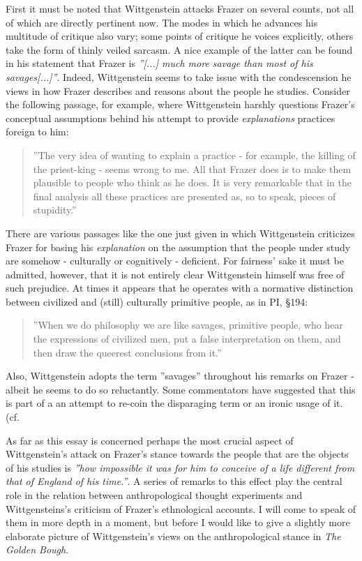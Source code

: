 \documentclass{article}
\begin{document}
First it must be noted that Wittgenstein attacks Frazer on several counts, not all of which are directly pertinent now. The modes in which he advances his multitude of critique also vary; some points of critique he voices explicitly, others take the form of thinly veiled sarcasm. A nice example of the latter can be found in his statement that Frazer is \textit{''[...] much more savage than most of his savages[...]''}.
Indeed, Wittgenstein seems to take issue with the condescension he views in how Frazer describes and reasons about the people he studies. Consider the following passage, for example, where Wittgenstein harshly questions Frazer's conceptual assumptions behind his attempt to provide \textit{explanations} practices foreign to him:
 \begin{quote}
 ''The very idea of wanting to explain a practice - for example, the killing of the priest-king - seems wrong to me. All that Frazer does is to make them plausible to people who think as he does. It is very remarkable that in the final analysis all these practices are presented as, so to speak, pieces of stupidity.''%
 \end{quote}
 There are various passages like the one just given in which Wittgenstein criticizes Frazer for basing his \textit{explanation} on the assumption that the people under study are somehow - culturally or cognitively - deficient. For fairness' sake it must be admitted, however, that it is not entirely clear Wittgenstein himself was free of such prejudice. At times it appears that he operates with a normative distinction between civilized and (still) culturally primitive people, as in PI, §194:
\begin{quote}
''When we do philosophy we are like savages, primitive people, who hear the expressions of civilized men, put a false interpretation on them, and then draw the queerest conclusions from it.''
\end{quote}
 Also, Wittgenstein adopts the term ''savages'' throughout his remarks on Frazer - albeit he seems to do so reluctantly. Some commentators have suggested that this is part of a an attempt to re-coin the disparaging term or an ironic usage of it. (cf. %

As far as this essay is concerned perhaps the most crucial aspect of Wittgenstein's attack on Frazer's stance towards the people that are the objects of his studies is \textit{''how impossible it was for him to conceive of a life different from that of England of his time.''}. A series of remarks to this effect play the central role in the relation between anthropological thought experiments and Wittgensteins's criticism of Frazer's ethnological accounts. I will come to speak of them in more depth in a moment, but before I would like to give a slightly more elaborate picture of Wittgenstein's views on the anthropological stance in \textit{The Golden Bough}.
 
\end{document}
